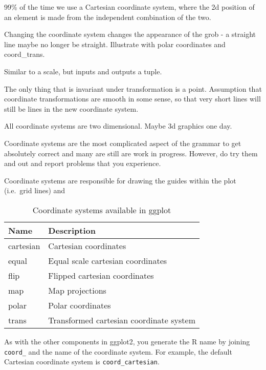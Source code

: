 99\% of the time we use a Cartesian coordinate system, where the 2d position of an element is made from the independent combination of the two.

Changing the coordinate system changes the appearance of the grob - a straight line maybe no longer be straight.  Illustrate with polar coordinates and coord\_trans.  

Similar to a scale, but inputs and outputs a tuple.

The only thing that is invariant under transformation is a point.  Assumption that coordinate transformations are smooth in some sense, so that very short lines will still be lines in the new coordinate system.

All coordinate systems are two dimensional.  Maybe 3d graphics one day.

Coordinate systems are the most complicated aspect of the grammar to get absolutely correct and many are still are work in progress.  However, do try them and out and report problems that you experience.


Coordinate systems are responsible for drawing the guides within the plot (i.e.\ grid lines) and 

\begin{table}
  \begin{center}
  \begin{tabular}{ll}
    \toprule
    Name      & Description  \\
    \midrule
    cartesian & Cartesian coordinates                  \\
    equal     & Equal scale cartesian coordinates      \\
    flip      & Flipped cartesian coordinates          \\
    map       & Map projections                        \\
    polar     & Polar coordinates                      \\
    trans     & Transformed cartesian coordinate system\\
    \bottomrule
    
  \end{tabular}
  \end{center}
  \caption{Coordinate systems available in ggplot}
  \label{tbl:coord}
\end{table}

As with the other components in ggplot2, you generate the R name by joining {\tt coord\_} and the name of the coordinate system.  For example, the default Cartesian coordinate system is {\tt coord\_cartesian}.

